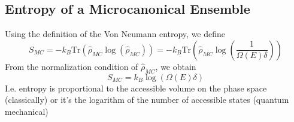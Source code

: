 \documentclass[a4paper, 11pt]{book}
\renewcommand{\trace}{\mathrm{Tr}}
\newcommand{\1}{\opr{\mathds{1}}}
\newcommand{\opr}[1]{\hat{#1}}
\theoremstyle{plain}
\begin{document}
		\subsection{Entropy of a Microcanonical Ensemble}
		Using the definition of the Von Neumann entropy, we define
		\begin{equation*}
			S_{MC}=-k_B\trace\left( \opr{\rho}_{MC}\log(\opr{\rho}_{MC}) \right)=-k_B\trace\left( \opr{\rho}_{MC}\log\left( \frac{1}{\Omega(E)\delta} \right) \right)
		\end{equation*}
		From the normalization condition of $\opr{\rho}_{MC}$, we obtain
		\begin{equation}
			S_{MC}=k_B\log\left( \Omega(E)\delta \right)
			\label{eq:microcanonicalentropy}
		\end{equation}
		I.e. entropy is proportional to the accessible volume on the phase space (classically) or it's the logarithm of the number of accessible states (quantum mechanical)\\
\end{document}
